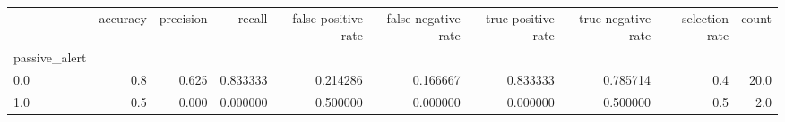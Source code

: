 \begin{tabular}{lrrrrrrrrr}
\toprule
{} &  accuracy &  precision &    recall &  false positive rate &  false negative rate &  true positive rate &  true negative rate &  selection rate &  count \\
passive\_alert &           &            &           &                      &                      &                     &                     &                 &        \\
\midrule
0.0           &       0.8 &      0.625 &  0.833333 &             0.214286 &             0.166667 &            0.833333 &            0.785714 &             0.4 &   20.0 \\
1.0           &       0.5 &      0.000 &  0.000000 &             0.500000 &             0.000000 &            0.000000 &            0.500000 &             0.5 &    2.0 \\
\bottomrule
\end{tabular}
